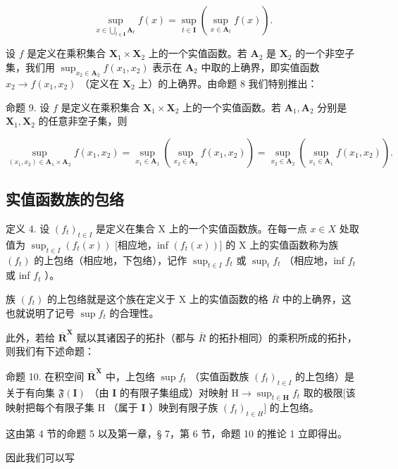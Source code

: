 \[
\sup_{x\in \bigcup_{t\in \mathbf{I}}\mathbf{A}_{t}}f(x) = \sup_{t\in \mathbf{I}}(\sup_{x\in \mathbf{A}_{t}}f(x)).\tag{7}
\]

设 \(f\) 是定义在乘积集合 \(\mathbf{X}_1 \times \mathbf{X}_2\) 上的一个实值函数。若 \(\mathbf{A}_2\) 是 \(\mathbf{X}_2\) 的一个非空子集，我们用 \(\sup_{x_2 \in \mathbf{A}_2} f(x_1, x_2)\) 表示在 \(\mathbf{A}_2\) 中取的上确界，即实值函数 \(x_2 \to f(x_1, x_2)\) （定义在 \(\mathbf{X}_2\) 上）的上确界。由命题 8 我们特别推出：

命题 9. 设 \(f\) 是定义在乘积集合 \(\mathbf{X}_1 \times \mathbf{X}_2\) 上的一个实值函数。若 \(\mathbf{A}_1, \mathbf{A}_2\) 分别是 \(\mathbf{X}_1, \mathbf{X}_2\) 的任意非空子集，则

\[
\sup _ {(x _ {1}, x _ {2}) \in \mathbf {A} _ {1} \times \mathbf {A} _ {2}} f (x _ {1}, x _ {2}) = \sup _ {x _ {1} \in \mathbf {A} _ {1}} (\sup _ {x _ {2} \in \mathbf {A} _ {2}} f (x _ {1}, x _ {2})) = \sup _ {x _ {2} \in \mathbf {A} _ {2}} (\sup _ {x _ {1} \in \mathbf {A} _ {1}} f (x _ {1}, x _ {2})).\tag{8}
\]

\subsection{实值函数族的包络}

定义 4. 设 \((f_{t})_{t\in I}\) 是定义在集合 X 上的一个实值函数族。在每一点 \(x\in X\) 处取值为 \(\sup_{t\in I}(f_t(x))\) {[}相应地，inf \((f_t(x))]\) 的 X 上的实值函数称为族 \((f_t)\) 的上包络（相应地，下包络），记作 \(\sup_{t\in I}f_{t}\) 或 \(\sup_{t}f_{t}\) （相应地，inf \(f_{t}\) 或 inf \(f_{t}\) ）。

族 \((f_{t})\) 的上包络就是这个族在定义于 X 上的实值函数的格 \(\overline{R}\) 中的上确界，这也就说明了记号 \(\sup f_{t}\) 的合理性。

此外，若给 \(\overline{\mathbf{R}}^{\mathbf{X}}\) 赋以其诸因子的拓扑（都与 \(\overline{R}\) 的拓扑相同）的乘积所成的拓扑，则我们有下述命题：

命题 10. 在积空间 \(\overline{\mathbf{R}}^{\mathbf{X}}\) 中，上包络 \(\sup f_{t}\) （实值函数族 \((f_{t})_{t\in I}\) 的上包络）是关于有向集 \(\mathfrak{F}(\mathbf{I})\) （由 \(\mathbf{I}\) 的有限子集组成）对映射 \(\mathrm{H}\to \sup_{t\in \mathbf{H}}f_t\) 取的极限{[}该映射把每个有限子集 \(\mathrm{H}\) （属于 \(\mathbf{I}\) ）映到有限子族 \((f_{t})_{t\in H}]\) 的上包络。

这由第 4 节的命题 5 以及第一章，§ 7，第 6 节，命题 10 的推论 1 立即得出。

因此我们可以写

